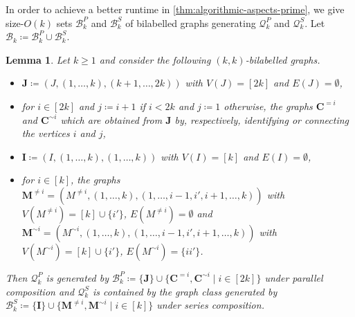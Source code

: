 \documentclass[11pt,a4paper]{article}
\theoremstyle{plain}
\newtheorem{lem}[thm]{Lemma}
\theoremstyle{remark}
\theoremstyle{definition}
\begin{document}
In order to achieve a better runtime in \cref{thm:algorithmic-aspects-prime}, we give size-$O(k)$ sets $\mathcal{B}_k^P$ and $\mathcal{B}_k^S$ of bilabelled graphs generating $\mathcal{Q}_k^P$ and $\mathcal{Q}_k^S$.
Let $\mathcal{B}_k \coloneqq \mathcal{B}_k^P \cup \mathcal{B}_k^S$.
\begin{lem} \label{lem:basal-graphs}
	Let $k \geq 1$ and consider the following $(k,k)$-bilabelled graphs.
	\begin{itemize}
		\item $\boldsymbol{J} \coloneqq (J, (1, \dots, k), (k+1, \dots, 2k))$ with $V(J) = [2k]$ and $E(J) = \emptyset$,
		\item for $i \in [2k]$ and $j \coloneqq i+1$ if $i < 2k$ and $j \coloneqq 1$ otherwise, the graphs $\boldsymbol{C}^{=i}$ and $\boldsymbol{C}^{\sim i}$ which are obtained from $\boldsymbol{J}$ by, respectively, identifying or connecting the vertices $i$ and $j$,
		\item $\boldsymbol{I} \coloneqq (I, (1, \dots, k), (1, \dots, k))$ with $V(I) = [k]$ and $E(I) = \emptyset$,
		\item for $i \in [k]$, the graphs $\boldsymbol{M}^{\neq i} = (M^{ \neq i}, (1, \dots, k), (1, \dots, i-1, i', i+1, \dots,k))$ with $V(M^{\neq i}) = [k] \cup \{i'\}$, $E(M^{\neq i}) = \emptyset$ and $\boldsymbol{M}^{\sim i} = (M^{\sim i}, (1, \dots, k), (1, \dots, i-1, i', i+1, \dots, k))$ with $V(M^{\sim i}) = [k] \cup \{i'\}$, $E(M^{\sim i}) = \{ii'\}$.
	\end{itemize}
	Then $\mathcal{Q}_k^P$ is generated by $\mathcal{B}_k^P \coloneqq \{\boldsymbol{J}\} \cup \{\boldsymbol{C}^{=i}, \boldsymbol{C}^{\sim i} \mid i \in [2k]\}$ under parallel composition
	and $\mathcal{Q}_k^S$ is contained by the graph class generated by $\mathcal{B}_k^S \coloneqq \{\boldsymbol{I}\} \cup \{\boldsymbol{M}^{\neq i}, \boldsymbol{M}^{\sim i} \mid i \in [k]\}$ under series composition.
\end{lem}
\end{document}
